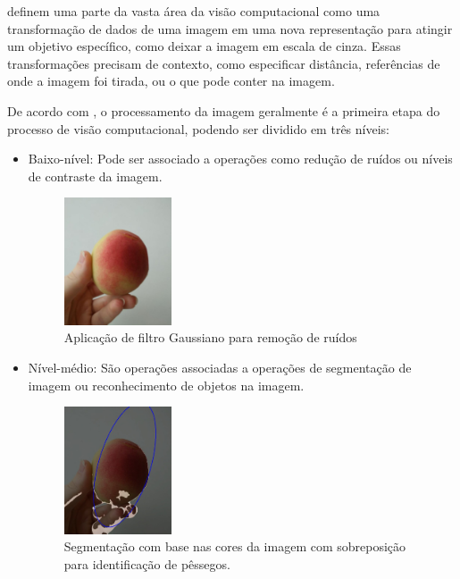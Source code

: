  definem uma parte da vasta área da visão computacional como uma transformação de dados de uma imagem em uma nova representação para atingir um objetivo específico, como deixar a imagem em escala de cinza. Essas transformações precisam de contexto, como especificar distância, referências de onde a imagem foi tirada, ou o que pode conter na imagem.

De acordo com , o processamento da imagem geralmente é a primeira etapa do processo de visão computacional, podendo ser dividido em três níveis: 

\begin{itemize}
\item Baixo-nível: 
	Pode ser associado a operações como redução de ruídos ou níveis de contraste da imagem. 
   \begin{figure}[h]
	\caption{\label{fig:blur}Aplicação de filtro Gaussiano para remoção de ruídos}
	\begin{center}
	    \includegraphics[width=0.3\textwidth]{peachs/blur}
	\end{center}
\end{figure} 
\item Nível-médio:
	São operações associadas a operações de segmentação de imagem ou reconhecimento de objetos na imagem.   
       \begin{figure}[H]
	\caption{\label{fig:segment}Segmentação com base nas cores da imagem com sobreposição para identificação de pêssegos.}
	\begin{center}
	    \includegraphics[width=0.3\textwidth]{peachs/identified}
	\end{center}
\end{figure}


\end{itemize}
